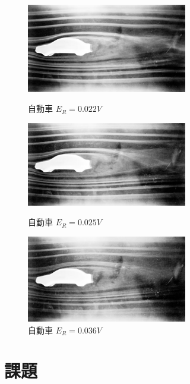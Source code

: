 \documentclass[twocolumn,10pt,a4j]{jsarticle}
\begin{document}
      \begin{figure}[htbp]
        \begin{minipage}{0.5\hsize}
          \begin{center}
            \includegraphics[width=7cm]{../img/kashika/012.jpg}
            \caption{自動車 $E_{R}=0.022V$}
          \end{center}
        \end{minipage}
        \begin{minipage}{0.5\hsize}
          \begin{center}
            \includegraphics[width=7cm]{../img/kashika/013.jpg}
            \caption{自動車 $E_{R}=0.025V$}
          \end{center}
        \end{minipage}
        \begin{minipage}{0.5\hsize}
          \begin{center}
            \includegraphics[width=7cm]{../img/kashika/014.jpg}
            \caption{自動車 $E_{R}=0.036V$}
          \end{center}
        \end{minipage}
      \end{figure}


\section{課題}
\end{document}
